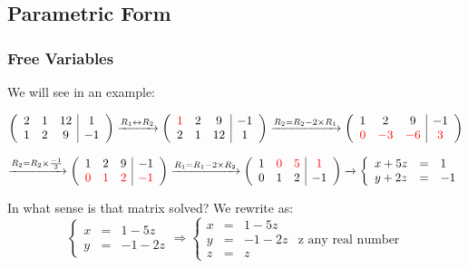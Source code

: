 \documentclass[a4paper,12pt]{article}
\begin{document}
\Large \subsection{Parametric Form}
\large \subsubsection{Free Variables}
    \begin{frame}
    \small

    \small We will see in an example:

    \[
    \left( \begin{array}{ccc|c}
    2 & 1 & 12 & 1\\
    1 & 2 & 9 & -1
    \end{array} \right)
    \xrightarrow{R_1 \leftrightarrow R_2}
    \left( \begin{array}{ccc|c}
    \textcolor{red}{1} & 2 & 9 & -1\\
    2 & 1 & 12 & 1
    \end{array} \right)
    \xrightarrow{R_2 = R_2 - 2 \times R_1}
    \left( \begin{array}{ccc|c}
    1 & 2 & 9 & -1\\
    \textcolor{red}{0} & \textcolor{red}{-3} & \textcolor{red}{-6} & \textcolor{red}{3}
    \end{array} \right)
    \]

    \[
    \xrightarrow{R_2 = R_2 \times \frac{-1}{3}}
    \left( \begin{array}{ccc|c}
    1 & 2 & 9 & -1\\
    \textcolor{red}{0} & \textcolor{red}{1} & \textcolor{red}{2} & \textcolor{red}{-1}
    \end{array} \right)
    \xrightarrow{R_1 = R_1 - 2 \times R_2}
    \left( \begin{array}{ccc|c}
    1 & \textcolor{red}{0} & \textcolor{red}{5} & \textcolor{red}{1}\\
    0 & 1 & 2 & -1
    \end{array} \right)
    \xrightarrow{}
    \left\{
    \begin{array}{lcl}
    x + 5z & = & 1\\
    y + 2z & = & -1
    \end{array}
    \right.
    \]

    In what sense is that matrix solved? We rewrite as:
    \[
    \left\{
    \begin{array}{lcr}
    x & = & 1 - 5z\\
    y & = & -1 - 2z
    \end{array}
    \right.
    \Rightarrow
    \left\{
    \begin{array}{lcrl}
    x & = & 1 - 5z\\
    y & = & -1 - 2z & \text{z any real number}\\
    z & = & z
    \end{array}
    \right.
    \]


\end{frame}
\end{document}
